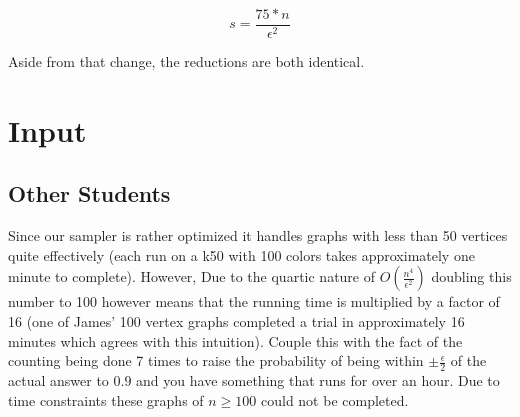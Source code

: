 \documentclass[14]{article}
\begin{document}
\[ s = \frac{75*n}{\epsilon^2} \]

Aside from that change, the reductions are both identical.

\section{Input}
\subsection{Other Students}
Since our sampler is rather optimized it handles graphs with less than 50 vertices quite effectively (each run on a k50 with 100 colors takes approximately one minute to complete). However, Due to the quartic nature of $O(\frac{n^4}{\epsilon^2})$ doubling this number to 100 however means that the running time is multiplied by a factor of 16 (one of James' 100 vertex graphs completed a trial in approximately 16 minutes which agrees with this intuition). Couple this with the fact of the counting being done 7 times to raise the probability of being within $\pm \frac{\epsilon}{2}$ of the actual answer to $0.9$ and you have something that runs for over an hour. Due to time constraints these graphs of $n \geq 100$ could not be completed.
\end{document}
